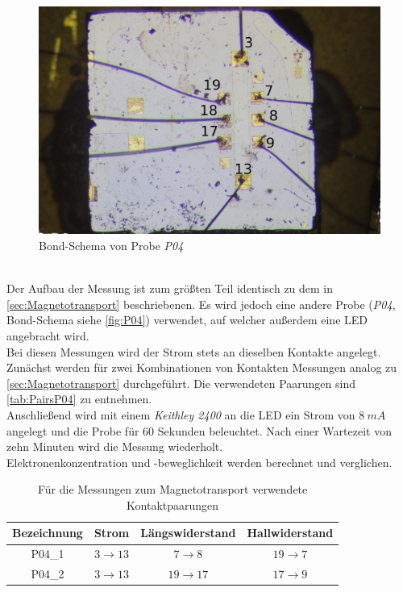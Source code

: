 \begin{figure}
\includegraphics[scale=0.05]{Pictures/P04BondSchema}
\caption{Bond-Schema von Probe \emph{P04}}
\label{fig:P04}
\end{figure}
\hfill\\
Der Aufbau der Messung ist zum größten Teil identisch zu dem in \autoref{sec:Magnetotransport} beschriebenen. Es wird jedoch eine andere Probe (\emph{P04}, Bond-Schema siehe \autoref{fig:P04}) verwendet, auf welcher außerdem eine LED angebracht wird.\\
Bei diesen Messungen wird der Strom stets an dieselben Kontakte angelegt.
Zunächst werden für zwei Kombinationen von Kontakten Messungen analog zu \autoref{sec:Magnetotransport} durchgeführt. Die verwendeten Paarungen sind \autoref{tab:PairsP04} zu entnehmen.\\
Anschließend wird mit einem \emph{Keithley 2400} an die LED ein Strom von $8\ \si{mA}$ angelegt und die Probe für $60$ Sekunden beleuchtet.
Nach einer Wartezeit von zehn Minuten wird die Messung wiederholt.\\
Elektronenkonzentration und -beweglichkeit werden berechnet und verglichen.

\begin{table}[ht]
\caption{Für die Messungen zum Magnetotransport verwendete Kontaktpaarungen}
\label{tab:PairsP04}
\centering
\begin{tabular}{cccc}
\toprule
Bezeichnung & Strom & Längswiderstand & Hallwiderstand\\
\midrule
P04\_1 & $3\rightarrow 13$ & $7\rightarrow 8$ & $19\rightarrow 7$\\
P04\_2 & $3\rightarrow 13$ & $19\rightarrow 17$ & $17\rightarrow 9$\\
\bottomrule
\end{tabular}
\end{table}

